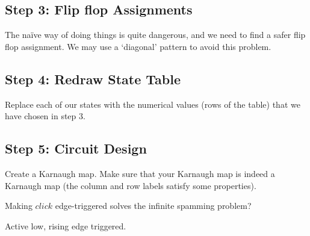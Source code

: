 \subsection*{Step 3: Flip flop Assignments}

The na\"{i}ve way of doing things is quite dangerous, and we need to find a safer flip flop assignment. We may use a `diagonal' pattern to avoid this problem.

\subsection*{Step 4: Redraw State Table}

Replace each of our states with the numerical values (rows of the table) that we have chosen in step 3.

\subsection*{Step 5: Circuit Design}

Create a Karnaugh map. Make sure that your Karnaugh map is indeed a Karnaugh map (the column and row labels satisfy some properties).

Making $click$ edge-triggered solves the infinite spamming problem? 

Active low, rising edge triggered.
